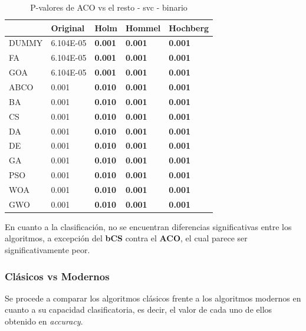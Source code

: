 \begin{table}[htp]
    \centering
    \begin{tabular}{lllll}
        \toprule
        {}    & Original  & Holm           & Hommel         & Hochberg       \\
        \midrule
        DUMMY & 6.104E-05 & \textbf{0.001} & \textbf{0.001} & \textbf{0.001} \\
        FA    & 6.104E-05 & \textbf{0.001} & \textbf{0.001} & \textbf{0.001} \\
        GOA   & 6.104E-05 & \textbf{0.001} & \textbf{0.001} & \textbf{0.001} \\
        ABCO  & 0.001     & \textbf{0.010} & \textbf{0.001} & \textbf{0.001} \\
        BA    & 0.001     & \textbf{0.010} & \textbf{0.001} & \textbf{0.001} \\
        CS    & 0.001     & \textbf{0.010} & \textbf{0.001} & \textbf{0.001} \\
        DA    & 0.001     & \textbf{0.010} & \textbf{0.001} & \textbf{0.001} \\
        DE    & 0.001     & \textbf{0.010} & \textbf{0.001} & \textbf{0.001} \\
        GA    & 0.001     & \textbf{0.010} & \textbf{0.001} & \textbf{0.001} \\
        PSO   & 0.001     & \textbf{0.010} & \textbf{0.001} & \textbf{0.001} \\
        WOA   & 0.001     & \textbf{0.010} & \textbf{0.001} & \textbf{0.001} \\
        GWO   & 0.001     & \textbf{0.010} & \textbf{0.001} & \textbf{0.001} \\
        \bottomrule
    \end{tabular}
    \caption{P-valores de ACO vs el resto - svc - binario}
    \label{tab:p-values_aco_rest_bin_svc}
\end{table}

En cuanto a la clasificación, no se encuentran diferencias significativas entre los algoritmos, a excepción del \textbf{bCS} contra el \textbf{ACO}, el cual parece ser significativamente peor.

\subsubsection{Clásicos vs Modernos}
Se procede a comparar los algoritmos clásicos frente a los algoritmos modernos en cuanto a su capacidad clasificatoria, es decir, el valor de cada uno de ellos obtenido en \textit{accuracy}.\\[6pt]

